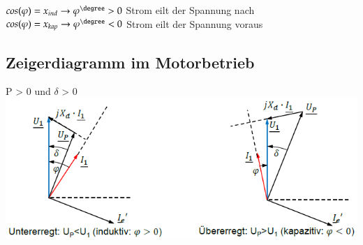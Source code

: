     \begin{minipage}{0.5\linewidth}
        $ cos(\varphi) = x_{ind} \rightarrow \varphi^\degree >0 $ Strom eilt der Spannung nach\newline
        $ cos(\varphi) = x_{kap} \rightarrow \varphi^\degree <0 $ Strom eilt der Spannung voraus\newline
    \end{minipage}
\subsection{Zeigerdiagramm im Motorbetrieb}
    P > 0 und $\delta$ > 0 \newline \newline
    \includegraphics[width = 12 cm]{images/ZeigerdiagrammSynchronmaschine}

